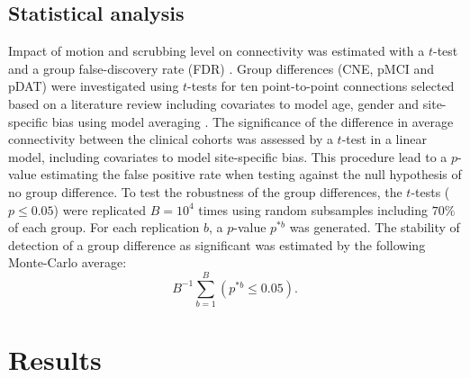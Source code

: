 \subsection{Statistical analysis}
Impact of motion and scrubbing level on connectivity was estimated with a $t$-test and a group false-discovery rate (FDR) \citep{Hu2010}. Group differences (CNE, pMCI and pDAT) were investigated using $t$-tests for ten point-to-point 
connections selected based on a literature review \citep{Dansereau2013} including covariates to model age, gender and site-specific bias using model averaging \citep{Willer2010}. The significance of the difference in average connectivity between the clinical cohorts was assessed by a $t$-test in a linear model, including covariates to model site-specific bias. This procedure lead to a $p$-value estimating the false positive rate when testing against the null hypothesis of no group difference. To test the robustness of the group differences, the $t$-tests ($p\leq0.05$) were replicated $B=10^4$ times using random subsamples including $70\%$ of each group. For each replication $b$, a $p$-value $p^{*b}$ was generated. The stability of detection of a group difference as significant was estimated by the following Monte-Carlo average: 
\begin{equation}\label{Detection power}  
    B^{-1}\sum\limits_{b=1}^B\left(p^{*b}\leq0.05\right).
\end{equation}

\section{Results} 
